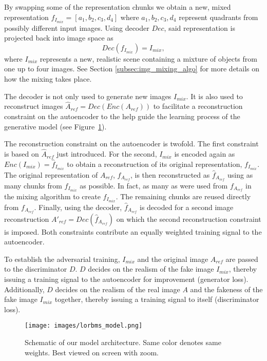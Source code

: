 \documentclass[a4paper,12pt]{report}
\begin{document}
By swapping some of the representation chunks we obtain a new, mixed representation $f_{I_{mix}} = [a_1, b_2, c_3, d_4]$ where $a_1,b_2,c_3,d_4$ represent quadrants from possibly different input images. Using decoder $Dec$, said representation is projected back into image space as
\begin{equation} \label{eq:3}
    Dec(f_{I_{mix}}) = I_{mix},
\end{equation}
where $I_{mix}$ represents a new, realistic scene containing a mixture of objects from one up to four images. See Section \ref{subsec:img_mixing_algo} for more details on how the mixing takes place.

The decoder is not only used to generate new images $I_{mix}$. It is also used to reconstruct images $\hat{A}_{ref} = Dec(Enc(A_{ref}))$ to facilitate a reconstruction constraint on the autoencoder to the help guide the learning process of the generative model (see Figure~\ref{fig:model_arch}).

The reconstruction constraint on the autoencoder is twofold. The first constraint is based on $\hat{A}_{ref}$ just introduced. For the second, $I_{mix}$ is encoded again as $Enc(I_{mix}) = \hat{f}_{I_{mix}}$ to obtain a reconstruction of its original representation, $f_{I_{mix}}$. The original representation of $A_{ref}$, $f_{A_{ref}}$, is then reconstructed as $\hat{f}_{A_{ref}}$ using as many chunks from $\hat{f}_{I_{mix}}$ as possible. In fact, as many as were used from $f_{A_{ref}}$ in the mixing algorithm to create $f_{I_{mix}}$. The remaining chunks are reused directly from $f_{A_{ref}}$. Finally, using the decoder, $\hat{f}_{A_{ref}}$ is decoded for a second image reconstruction $A'_{ref} = Dec(\hat{f}_{A_{ref}})$ on which the second reconstruction constraint is imposed. Both constraints contribute an equally weighted training signal to the autoencoder.

To establish the adversarial training, $I_{mix}$ and the original image $A_{ref}$ are passed to the discriminator $D$. $D$ decides on the realism of the fake image $I_{mix}$, thereby issuing a training signal to the autoencoder for improvement (generator loss). Additionally, $D$ decides on the realism of the real image $A$ and the fakeness of the fake image $I_{mix}$ together, thereby issuing a training signal to itself (discriminator loss).

\begin{figure}[ht]
\centering
\texttt{[image: images/lorbms\_model.png]}
\caption[Schematic of our model architecture.]{Schematic of our model architecture. Same color denotes same weights. Best viewed on screen with zoom.}
\label{fig:model_arch}
\end{figure}
\end{document}
